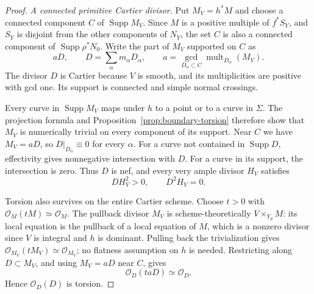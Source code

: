 \begin{proof}
\emph{A connected primitive Cartier divisor.}
Put $M_V=h^*M$ and choose a connected component $C$ of
$\operatorname{Supp}M_V$.  Since $M$ is a positive multiple of
$f^*S_Y$, and $S_Y$ is disjoint from the other components of
$N_Y$, the set $C$ is also a connected component of
$\operatorname{Supp}\rho^*N_0$.  Write the part of $M_V$ supported
on $C$ as
\begin{equation}\label{eq:primitive-cycle}
 aD,\qquad D=\sum_\alpha m_\alpha D_\alpha,
 \qquad a=\gcd_{D_\alpha\subset C}
                       \operatorname{mult}_{D_\alpha}(M_V).
\end{equation}
The divisor $D$ is Cartier because $V$ is smooth, and its
multiplicities are positive with gcd one.  Its support is connected
and simple normal crossings.

Every curve in $\operatorname{Supp}M_V$ maps under $h$ to a point or
to a curve in $\Sigma$.  The projection formula and
Proposition~\ref{prop:boundary-torsion} therefore show that $M_V$
is numerically trivial on every component of its support.  Near $C$
we have $M_V=aD$, so $D|_{D_\alpha}\equiv0$ for every $\alpha$.
For a curve not contained in $\operatorname{Supp}D$, effectivity
gives nonnegative intersection with $D$.  For a curve in its support,
the intersection is zero.  Thus $D$ is nef, and every very ample
divisor $H_V$ satisfies
\begin{equation}\label{eq:primitive-intersections}
 D H_V^2>0,\qquad D^2H_V=0.
\end{equation}

Torsion also survives on the entire Cartier scheme.  Choose $t>0$
with $\mathcal O_M(tM)\simeq\mathcal O_M$.  The pullback divisor
$M_V$ is scheme-theoretically $V\times_{Y_d}M$: its local equation
is the pullback of a local equation of $M$, which is a nonzero
divisor since $V$ is integral and $h$ is dominant.  Pulling back
the trivialization gives
$\mathcal O_{M_V}(tM_V)\simeq\mathcal O_{M_V}$; no flatness
assumption on $h$ is needed.  Restricting along $D\subset M_V$,
and using $M_V=aD$ near $C$, gives
\begin{equation}\label{eq:primitive-torsion}
 \mathcal O_D(taD)\simeq\mathcal O_D.
\end{equation}
Hence $\mathcal O_D(D)$ is torsion.


\end{proof}
